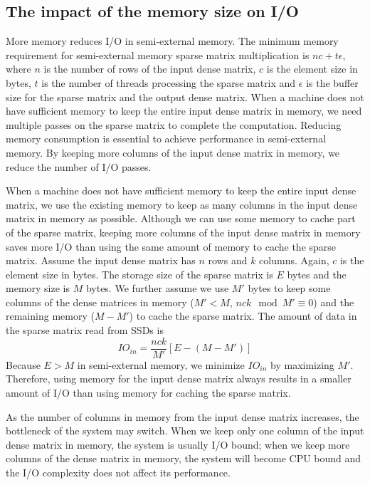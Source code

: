 \subsection{The impact of the memory size on I/O}
\label{sec:mem}
More memory reduces I/O in semi-external memory.
The minimum memory requirement for semi-external memory sparse matrix
multiplication is $n c + t \epsilon$, where $n$ is the number of rows
of the input dense matrix, $c$ is the element size in bytes,
$t$ is the number of threads processing the sparse matrix
and $\epsilon$ is the buffer size for the sparse matrix and the output
dense matrix. When a machine does not have sufficient memory to keep the entire
input dense matrix in memory, we need multiple passes on the sparse matrix to
complete the computation. Reducing memory consumption is essential
to achieve performance in semi-external memory. By keeping more columns of
the input dense matrix in memory, we reduce the number of I/O passes.

When a machine does not have sufficient memory to keep the entire input dense
matrix, we use the existing memory to keep as many columns in the input
dense matrix in memory as possible. Although we can use some memory to cache
part of the sparse matrix,
keeping more columns of the input dense matrix in memory saves more I/O than
using the same amount of memory to cache the sparse matrix. Assume the input
dense matrix has $n$ rows and $k$ columns. Again, $c$ is the element size
in bytes. The storage size of the sparse
matrix is $E$ bytes and the memory size is $M$ bytes. We further assume
we use $M'$ bytes to keep some columns of the dense matrices in memory
($M' < M$, ${n c k} \mod {M'} \equiv 0$)
and the remaining memory ($M - M'$) to cache the sparse matrix.
The amount of data in the sparse matrix read from SSDs is
\begin{equation*}
IO_{in} = \frac{n c k}{M'} [E - (M - M')]
\end{equation*}
Because $E > M$ in semi-external memory, we minimize $IO_{in}$ by maximizing $M'$.
Therefore, using memory for the input dense matrix always results in a smaller
amount of I/O than using memory for caching the sparse matrix.

As the number of columns in memory from the input dense matrix increases,
the bottleneck of the system
may switch. When we keep only one column of the input dense matrix in memory,
the system is usually I/O bound; when we keep more columns of the dense matrix
in memory, the system will become CPU bound and the I/O complexity does not
affect its performance.


